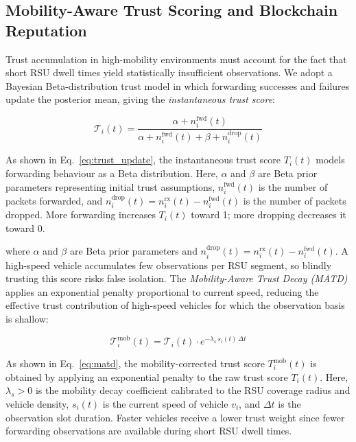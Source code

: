 \documentclass[12pt, a4paper]{report}
\begin{document}
\subsection{Mobility-Aware Trust Scoring and Blockchain Reputation}

Trust accumulation in high-mobility environments must account for the fact that
short RSU dwell times yield statistically insufficient observations. We adopt a
Bayesian Beta-distribution trust model in which forwarding successes and failures
update the posterior mean, giving the \emph{instantaneous trust score}:

\begin{equation}
\label{eq:trust_update}
\mathcal{T}_i(t) = \frac{\alpha + n_i^{\text{fwd}}(t)}
                         {\alpha + n_i^{\text{fwd}}(t)
                          + \beta + n_i^{\text{drop}}(t)}
\end{equation}

As shown in Eq.~\eqref{eq:trust_update}, the instantaneous trust score $T_i(t)$ models forwarding behaviour as a Beta distribution. Here, $\alpha$ and $\beta$ are Beta prior parameters representing initial trust assumptions, $n_i^{\text{fwd}}(t)$ is the number of packets forwarded, and $n_i^{\text{drop}}(t) = n_i^{\text{rx}}(t) - n_i^{\text{fwd}}(t)$ is the number of packets dropped. More forwarding increases $T_i(t)$ toward 1; more dropping decreases it toward 0.

\noindent where $\alpha$ and $\beta$ are Beta prior parameters and
$n_i^{\text{drop}}(t) = n_i^{\text{rx}}(t) - n_i^{\text{fwd}}(t)$.
A high-speed vehicle accumulates few observations per RSU segment, so blindly
trusting this score risks false isolation. The \emph{Mobility-Aware Trust
Decay (MATD)} applies an exponential penalty proportional to current speed,
reducing the effective trust contribution of high-speed vehicles for which
the observation basis is shallow:

\begin{equation}
\label{eq:matd}
\mathcal{T}_i^{\text{mob}}(t) = \mathcal{T}_i(t) \cdot
e^{-\lambda_s\, s_i(t)\, \Delta t}
\end{equation}

As shown in Eq.~\eqref{eq:matd}, the mobility-corrected trust score $T_i^{\text{mob}}(t)$ is obtained by applying an exponential penalty to the raw trust score $T_i(t)$. Here, $\lambda_s > 0$ is the mobility decay coefficient calibrated to the RSU coverage radius and vehicle density, $s_i(t)$ is the current speed of vehicle $v_i$, and $\Delta t$ is the observation slot duration. Faster vehicles receive a lower trust weight since fewer forwarding observations are available during short RSU dwell times.
\end{document}
